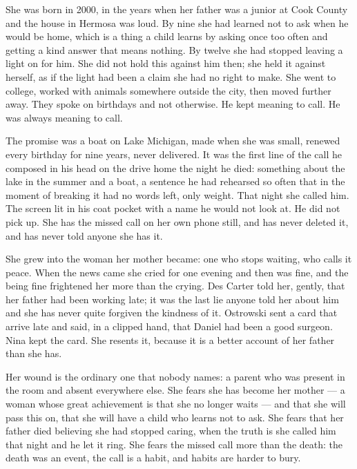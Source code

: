\documentclass{design/chronicle}
\begin{document}
{\begin{itemize}[leftmargin=1.4em,itemsep=1pt,topsep=3pt,parsep=0pt]
\end{itemize}

She was born in 2000, in the years when her father was a junior at Cook County and the house in Hermosa was loud. By nine she had learned not to ask when he would be home, which is a thing a child learns by asking once too often and getting a kind answer that means nothing. By twelve she had stopped leaving a light on for him. She did not hold this against him then; she held it against herself, as if the light had been a claim she had no right to make. She went to college, worked with animals somewhere outside the city, then moved further away. They spoke on birthdays and not otherwise. He kept meaning to call. He was always meaning to call.

The promise was a boat on Lake Michigan, made when she was small, renewed every birthday for nine years, never delivered. It was the first line of the call he composed in his head on the drive home the night he died: something about the lake in the summer and a boat, a sentence he had rehearsed so often that in the moment of breaking it had no words left, only weight. That night she called him. The screen lit in his coat pocket with a name he would not look at. He did not pick up. She has the missed call on her own phone still, and has never deleted it, and has never told anyone she has it.

She grew into the woman her mother became: one who stops waiting, who calls it peace. When the news came she cried for one evening and then was fine, and the being fine frightened her more than the crying. Des Carter told her, gently, that her father had been working late; it was the last lie anyone told her about him and she has never quite forgiven the kindness of it. Ostrowski sent a card that arrive late and said, in a clipped hand, that Daniel had been a good surgeon. Nina kept the card. She resents it, because it is a better account of her father than she has.

Her wound is the ordinary one that nobody names: a parent who was present in the room and absent everywhere else. She fears she has become her mother — a woman whose great achievement is that she no longer waits — and that she will pass this on, that she will have a child who learns not to ask. She fears that her father died believing she had stopped caring, when the truth is she called him that night and he let it ring. She fears the missed call more than the death: the death was an event, the call is a habit, and habits are harder to bury.

}
\end{document}
